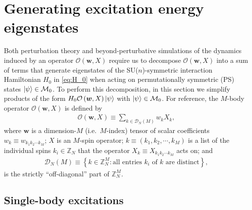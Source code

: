 \documentclass[nofootinbib,notitlepage,11pt]{revtex4-2}
\renewcommand{\t}{\text} %
\newcommand{\p}[1]{\left(#1\right)} %
\renewcommand{\set}[1]{\left\{#1\right\}} %
\newcommand{\m}{\bm} %
\newcommand{\1}{\mathds{1}}
\newcommand{\D}{\mathcal{D}}
\newcommand{\M}{\mathcal{M}}
\renewcommand{\O}{\mathcal{O}}
\newcommand{\ZZ}{\mathbb{Z}}
\begin{document}
\section{Generating excitation energy eigenstates}
\label{sec:eigenstates}

Both perturbation theory and beyond-perturbative simulations of the dynamics induced by an operator $\O\p{\m w,X}$ require us to decompose $\O\p{\m w,X}$ into a sum of terms that generate eigenstates of the SU($n$)-symmetric interaction Hamiltonian $H_0$ in \eqref{eq:H_0} when acting on permutationally symmetric (PS) states $\ket\psi\in\M_0$.
To perform this decomposition, in this section we simplify products of the form $H_0\O\p{\m w,X}\ket\psi$ with $\ket\psi\in\M_0$.
For reference, the $M$-body operator $\O\p{\m w,X}$ is defined by
\begin{align}
  \O\p{\m w,X} \equiv \sum_{k\in\D_N\p{M}} w_k X_k,
\end{align}
where $\m w$ is a dimension-$M$ (i.e.~$M$-index) tensor of scalar coefficients $w_k\equiv w_{k_1k_2\cdots k_M}$; $X$ is an $M$-spin operator; $k\equiv\p{k_1,k_2,\cdots,k_M}$ is a list of the individual spins $k_i\in\ZZ_N$ that the operator $X_k\equiv X_{k_1k_2\cdots k_M}$ acts on; and
\begin{align}
  \D_N\p{M} \equiv
  \set{ k \in \ZZ_N^M: \t{all entries $k_i$ of $k$ are distinct} },
\end{align}
is the strictly ``off-diagonal'' part of $\ZZ_N^M$.

\subsection{Single-body excitations}
\label{sec:single_body_eigenstates}
\end{document}
